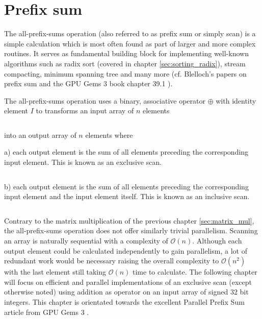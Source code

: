 \chapter{Prefix sum}
\label{sec:prefix_sum}

The all-prefix-sums operation (also referred to as prefix sum or simply scan) is a simple calculation which is most often found as part of larger and more complex routines. It serves as fundamental building block for implementing well-known algorithms such as radix sort (covered in chapter \ref{sec:sorting_radix}), stream compacting, minimum spanning tree and many more (cf. Blelloch's papers on prefix sum \cite{scan_blelloch_examples} \cite{scan_blelloch} and the GPU Gems 3 book chapter 39.1 \cite{gpu_gems_3_chapter_39}).

The all-prefix-sums operation uses a binary, associative operator $\oplus$ with identity element $I$ to transforms an input array of $n$ elements

\begin{equation*}
[a_0, a_1, \dots, a_{n-1}]
\end{equation*}

into an output array of $n$ elements where

a) each output element is the sum of all elements preceding the corresponding input element. This is known as an exclusive scan. \cite{gpu_gems_3_chapter_39}

\begin{equation*}
[I, a_0, (a_0 \oplus a_1), \dots, (a_0 \oplus a_1 \oplus \dots \oplus a_{n-2})]
\end{equation*}

b) each  output element is the sum of all elements preceding the corresponding input element and the input element itself. This is known as an inclusive scan. \cite{gpu_gems_3_chapter_39}

\begin{equation*}
[a_0, (a_0 \oplus a_1), \dots, (a_0 \oplus a_1 \oplus \dots \oplus a_{n-1})]
\end{equation*}

Contrary to the matrix multiplication of the previous chapter \ref{sec:matrix_mul}, the all-prefix-sums operation does not offer similarly trivial parallelism. Scanning an array is naturally sequential with a complexity of $\mathcal{O}(n)$. Although each output element could be calculated independently to gain parallelism, a lot of redundant work would be necessary raising the overall complexity to $\mathcal{O}(n^2)$ with the last element still taking $\mathcal{O}(n)$ time to calculate.
The following chapter will focus on efficient and parallel implementations of an exclusive scan (except otherwise noted) using addition as operator on an input array of signed 32 bit integers. This chapter is orientated towards the excellent Parallel Prefix Sum article from GPU Gems 3 \cite{gpu_gems_3_chapter_39}.


